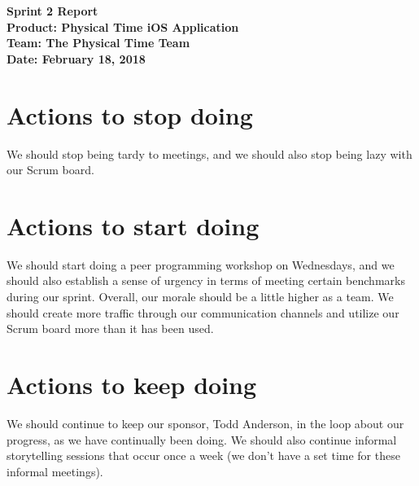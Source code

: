 \documentclass[11pt]{article}
\newcommand\tab[1][1cm]{\hspace*{#1}}
\begin{document}
	\Large{\textbf{Sprint 2 Report}}\\
	\Large{\textbf{Product: Physical Time iOS Application}}\\
	\Large{\textbf{Team: The Physical Time Team}}\\
	\Large{\textbf{Date: February 18, 2018}}\\
	
	\vspace{-3mm}
	
	\section{Actions to stop doing}
		\vspace{-3mm}
		\tab \normalsize{We should stop being tardy to meetings, and we should also stop being lazy with our Scrum board.}
		
	\section{Actions to start doing}
		\vspace{-3mm}
		\tab \normalsize{We should start doing a peer programming workshop on Wednesdays, and we should also establish a sense of urgency in terms of meeting certain benchmarks during our sprint. Overall, our morale should be a little higher as a team. We should create more traffic through our communication channels and utilize our Scrum board more than it has been used.}
		
	\section{Actions to keep doing}
		\vspace{-3mm}
		\tab \normalsize{We should continue to keep our sponsor, Todd Anderson, in the loop about our progress, as we have continually been doing. We should also continue informal storytelling sessions that occur once a week (we don't have a set time for these informal meetings).}
		
\end{document}

